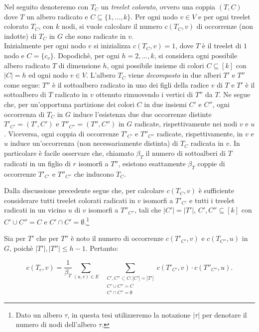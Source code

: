 Nel seguito denoteremo con $ T_C $ un \emph{treelet colorato}, ovvero una coppia $ (T,C) $ dove $ T $ un albero radicato e $ C \subseteq \{1,\dots,k\}$.
Per ogni nodo $ v \in V $ e per ogni treelet colorato $ T_C $, con $ k $ nodi, si vuole calcolare il numero $ c(T_C , v) $ di occorrenze (non indotte) di $ T_C $  in $ G $ che sono radicate in $v$.\\
Inizialmente per ogni nodo $ v $ si inizializza $ c(T_C , v) = 1 $, dove $T$ \`e il treelet di $1$ nodo e $ C = \{c_v\}$.
Dopodichè, per ogni $ h = 2,\dots,k $,  si considera ogni possibile albero radicato $T$ di dimensione $ h $, ogni possibile insieme di colori $ C \subseteq [k] $ con $ |C| = h $ ed ogni nodo $v \in V$.
L'albero $T_C$ viene \emph{decomposto} in due alberi $T'$ e $T''$ come segue: $ T'' $ \`e il sottoalbero radicato in uno dei figli della radice $ v $ di $ T $ e $ T' $ \`e il sottoalbero di $ T $ radicato in $ v $ ottenuto rimuovendo i vertici di $T''$ da $T$.
Ne segue che, per un'opportuna partizione dei colori $C$ in due insiemi $C'$ e $C''$, ogni occorrenza di $T_C$ in $G$ induce l'esistenza due due occorrenze distinte $T'_{C'} = (T', C')$ e $T''_{C''} = (T'', C'')$  in $G$ radicate, rispettivamente nei nodi $v$ e $u$.
Viceversa, ogni coppia di occorrenze $T'_{C'}$ e $T''_{C''}$ radicate, rispettivamente, in $v$ e $u$ induce un'occorrenza (non necessariamente distinta) di $T_C$ radicata in $v$.
In particolare è facile osservare che, chiamato $\beta_T$ il numero di sottoalberi di $T$ radicati in un figlio di $r$ isomorfi a $T''$, esistono esattamente $\beta_T$ coppie di occorrenze $T'_{C'}$ e $T''_{C''}$ che inducono $T_C$. 

Dalla discussione precedente segue che, per calcolare $ c(T_C,v)$ è sufficiente considerare tutti treelet colorati radicati in $ v $ isomorfi a $ T'_{C'} $ e tutti i  treelet radicati in un vicino $ u $ di $v$ isomorfi a $ T''_{C''} $, tali che $|C'|=|T'|$, $C',C'' \subseteq [k] $ con  $C' \cup C'' = C$ e $C' \cap C' = \emptyset$.\footnote{Dato un albero $\tau$, in questa tesi utilizzeremo la notazione $|\tau|$ per denotare il numero di nodi dell'albero $\tau$.}

Sia per $ T' $ che per $ T'' $ \`e noto il numero di occorrenze $ c(T'_{C'},v) $ e $ c(T_{C''},u) $ in $ G $, poich\`e $|T'|, |T''| \le h-1$. Pertanto:

\begin{equation}\label{conta}
	c(T_c,v)=\frac{1}{\beta_T}\sum_{(u,v)\in E} \;\; \sum_{\substack{C', C'' \subset C : |C'| = |T'| \\C' \cup C'' = C  \\ C' \cap C'' = \emptyset}}c(T'_{C'},v)\cdot c(T''_{C''},u).
\end{equation}

